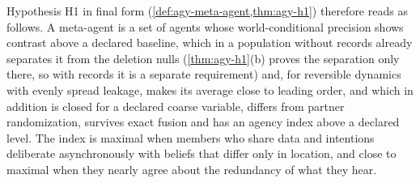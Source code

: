 Hypothesis H1 in final form (\cref{def:agy-meta-agent,thm:agy-h1}) therefore reads as follows. A meta-agent is a set of agents whose world-conditional precision shows contrast above a declared baseline, which in a population without records already separates it from the deletion nulls (\cref{thm:agy-h1}(b) proves the separation only there, so with records it is a separate requirement) and, for reversible dynamics with evenly spread leakage, makes its average close to leading order, and which in addition is closed for a declared coarse variable, differs from partner randomization, survives exact fusion and has an agency index above a declared level. The index is maximal when members who share data and intentions deliberate asynchronously with beliefs that differ only in location, and close to maximal when they nearly agree about the redundancy of what they hear.
